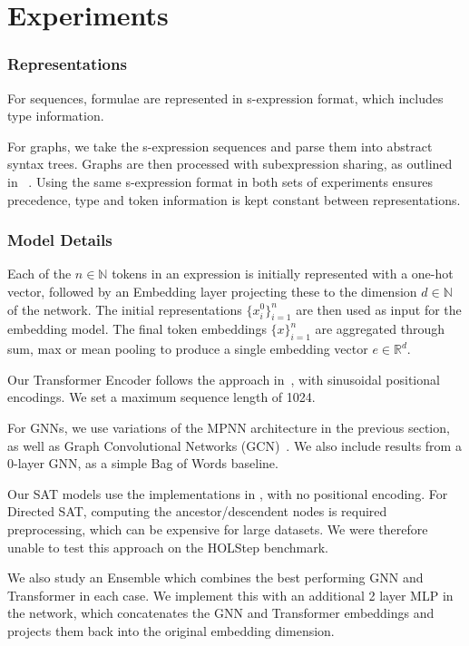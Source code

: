 \documentclass[letterpaper]{article} %
\newcommand\dataset[1]{#1}
\begin{document}
    \section{Experiments}

    \subsubsection{Representations}
    For sequences, formulae are represented in s-expression format, which includes type information.

    For graphs, we take the s-expression sequences and parse them into abstract syntax trees. Graphs are then processed with subexpression sharing, as outlined in ~\cite{paliwal_graph_2020}.
    Using the same s-expression format in both sets of experiments ensures precedence, type and token information is kept constant between representations.

    \subsubsection{Model Details}
    Each of the $n\in\mathbb{N}$ tokens in an expression is initially represented with a one-hot vector,
    followed by an Embedding layer projecting these to the dimension $d\in \mathbb{N}$ of the network. The initial representations $\{x_i^0\}_{i=1}^{n}$ are then used as input for the embedding model. The final token embeddings $\{x\}_{i=1}^{n}$ are aggregated through sum, max or mean pooling to produce a single embedding vector $e \in \mathbb{R}^d$.

    Our Transformer Encoder follows the approach in~\cite{vaswani_attention_2017}, with sinusoidal positional encodings. We set a maximum sequence length of 1024.

    For GNNs, we use variations of the MPNN architecture in the previous section, as well as Graph Convolutional Networks (GCN)~\cite{zhang_graph_2019}.
    We also include results from a 0-layer GNN, as a simple Bag of Words baseline.

    Our SAT models use the implementations in \cite{chen_structure-aware_2022, luo_transformers_2023}, with no positional encoding.
    For Directed SAT, computing the ancestor/descendent nodes is required preprocessing, which can be expensive for large datasets.
    We were therefore unable to test this approach on the \dataset{HOLStep} benchmark.

    We also study an Ensemble which combines the best performing GNN and Transformer in each case. We implement this with an additional 2 layer MLP in the network, which concatenates the GNN and Transformer embeddings and projects them back into the original embedding dimension.
\end{document}
